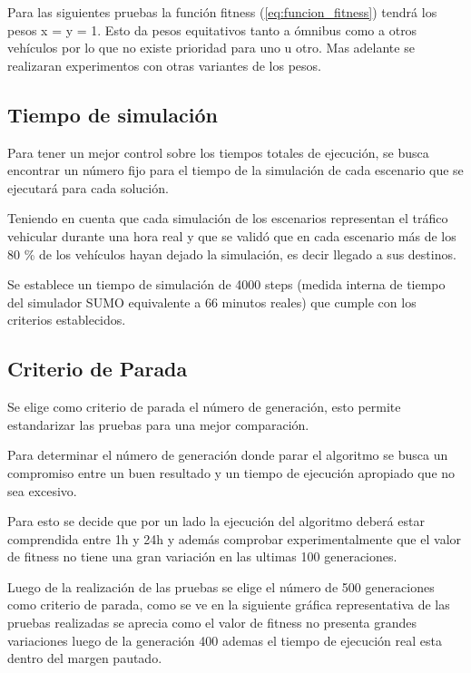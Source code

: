 Para las siguientes pruebas la función fitness (\ref{eq:funcion_fitness}) tendrá los pesos x = y = 1. Esto da pesos equitativos tanto a ómnibus como a otros vehículos por lo que no existe prioridad para uno u otro. Mas adelante se realizaran experimentos con otras variantes de los pesos.


\subsection{Tiempo de simulación}

Para tener un mejor control sobre los tiempos totales de ejecución, se busca encontrar un número fijo para el tiempo de la simulación de cada escenario que se ejecutará para cada solución.

Teniendo en cuenta que cada simulación de los escenarios representan el tráfico vehicular durante una hora real y que se validó que en cada escenario más de los 80 \% de los vehículos hayan dejado la simulación, es decir llegado a sus destinos.

Se establece un tiempo de simulación de 4000 steps (medida interna de tiempo del simulador SUMO equivalente a 66 minutos reales) que cumple con los criterios establecidos. 

\subsection{Criterio de Parada}
Se elige como criterio de parada el número de generación, esto permite estandarizar las pruebas para una mejor comparación.

Para determinar el número de generación donde parar el algoritmo se busca un compromiso entre un buen resultado y un tiempo de ejecución apropiado que no sea excesivo.

Para esto se decide que por un lado la ejecución del algoritmo deberá estar comprendida entre 1h y 24h y además comprobar experimentalmente que el valor de fitness no tiene una gran variación en las ultimas 100 generaciones.

Luego de la realización de las pruebas se elige el número de 500 generaciones como criterio de parada, como se ve en la siguiente gráfica representativa de las pruebas realizadas se aprecia como el valor de fitness no presenta grandes variaciones luego de la generación 400 ademas el tiempo de ejecución real esta dentro del margen pautado.




